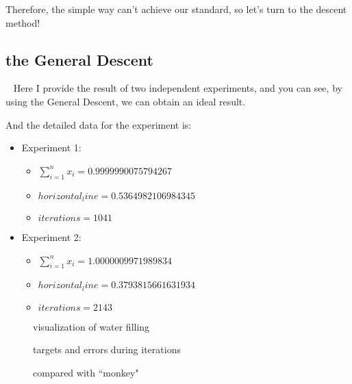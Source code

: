 \documentclass[a4paper,12pt]{article}
\begin{document}
    Therefore, the simple way can't achieve our standard, so let's turn to the descent method! 
    \subsection{the General Descent}
    \
    \newline
    \indent Here I provide the result of two independent experiments, and you can see, by using the General Descent, we can obtain an ideal result.

    And the detailed data for the experiment is:
    \begin{itemize}
        \item Experiment 1:
        \begin{itemize}
            \item $\sum_{i=1}^{n} x_i = 0.9999990075794267$
            \item $horizontal_line = 0.5364982106984345$
            \item $iterations = 1041$ 
        \end{itemize}
        \item Experiment 2:
        \begin{itemize}
            \item $\sum_{i=1}^{n} x_i = 1.0000009971989834$
            \item $horizontal_line = 0.3793815661631934$
            \item $iterations = 2143$
        \end{itemize}
    \end{itemize}
    \begin{figure}[H]
        \centering
        \quad
        \caption{visualization of water filling}
    \end{figure}
    \begin{figure}[H]
        \centering
        \quad
        \caption{targets and errors during iterations}
    \end{figure}
    \begin{figure}[H]
        \centering
        \quad
        \caption{compared with ``monkey"}
    \end{figure}
\end{document}
